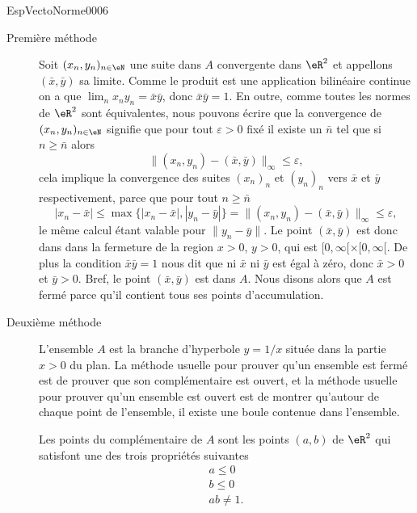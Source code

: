 \begin{corrige}{EspVectoNorme0006}

  \begin{description}
    \item[Première méthode]  Soit $(x_n, y_n)_{n\in\eN}$ une suite dans $A$ convergente dans $\eR^2$  et appellons $(\bar x,\bar y)$ sa limite. Comme le produit est une application bilinéaire continue on a que $\lim_{n} x_ny_n= \bar x \bar y$, donc $\bar x \bar y=1$. En outre, comme toutes les normes de $\eR^2$ sont équivalentes, nous pouvons écrire que la convergence de $(x_n, y_n)_{n\in\eN}$ signifie que pour tout $\varepsilon>0$ fixé il existe un $\bar n$ tel que si $n\geq \bar n$ alors  
\begin{equation}
  \|(x_n, y_n)-(\bar x, \bar y)\|_\infty\leq \varepsilon,
\end{equation}
cela implique la convergence des suites $(x_n)_n$ et $(y_n)_n$ vers $\bar x$ et $\bar y$ respectivement, parce que pour tout $n\geq \bar n$
\begin{equation}
 |x_n-\bar x|\leq \max\{|x_n-\bar x|,|y_n-\bar y| \}= \|(x_n, y_n)-(\bar x, \bar y)\|_\infty\leq \varepsilon,
\end{equation} 
le même calcul étant valable pour $\|y_n-\bar y\|$. Le point $(\bar x,\bar y)$ est donc dans dans la fermeture de la region $x>0$, $y>0$, qui est $[0,\infty[\times [0,\infty[$. De plus la condition $\bar x \bar y=1$ nous dit que ni $\bar x$ ni $\bar y$ est égal à zéro, donc $\bar x>0$ et $\bar y>0$. Bref, le point  $(\bar x, \bar y)$ est dans $A$. Nous disons alors que $A$ est fermé parce qu'il contient tous ses points d'accumulation.  
 \item[Deuxième méthode] L'ensemble $A$ est la branche d'hyperbole $y=1/x$ située dans la partie $x>0$ du plan. La méthode usuelle pour prouver qu'un ensemble est fermé est de prouver que son complémentaire est ouvert, et la méthode usuelle pour prouver qu'un ensemble est ouvert est de montrer qu'autour de chaque point de l'ensemble, il existe une boule contenue dans l'ensemble.

	Les points du complémentaire de $A$ sont les points $(a,b)$ de $\eR^2$ qui satisfont une des trois propriétés suivantes
	\begin{subequations}
		\begin{align}
			a\leq 0\\
			b\leq 0\\
			ab\neq 1		\label{subEqxyneq106}.
		\end{align}
	\end{subequations}


\end{description}
\end{corrige}
